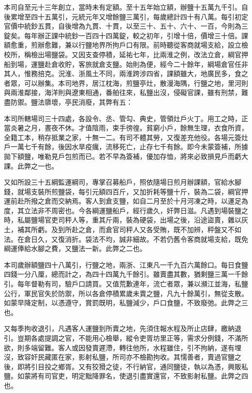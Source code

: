 \begin{pinyinscope}
 本司自至元十三年創立，當時未有定額。至十五年始立額，辦鹽十五萬九千引。自後累增至四十五萬引，元統元年又增餘鹽三萬引，每歲總計四十有八萬。每引初定官價中統鈔五貫，自後增為九貫、十貫，以至三十、五十、六十、一百，今則為三錠矣。每年辦正課中統鈔一百四十四萬錠，較之初年，引增十倍，價增三十倍。課額愈重，煎辦愈難，兼以行鹽地界所拘戶口有限。前時聽從客商就場支給，設立檢校所，稱檢出場鹽袋。又因支查停積，延祐七年，比兩淮之例，改法立倉，綱官押船到場，運鹽赴倉收貯，客旅就倉支鹽。始則為便，經今二十餘年，綱場倉官任非其人，惟務掊克。況淮、浙風土不同，兩淮跨涉四省，課額雖大，地廣民多，食之者眾，可以辦集。本司地界，居江枕海，煎鹽亭灶，散漫海隅，行鹽之地，里河則與兩淮鄰接，海洋則與遼東相通，番舶往來，私鹽出沒，侵礙官課，雖有刑禁，難盡防禦。鹽法隳壞，亭民消廢，其弊有五：



 本司所轄場司三十四處，各設令、丞、管勾、典史，管領灶戶火丁。用工之時，正當炎暑之月，晝夜不休。才值陰雨，束手徬徨。貧窮小戶，餘無生理，衣食所資，全籍工本，稍存抵業之家，十無一二。有司不體其勞，又復差充他役。各場元簽灶戶一萬七千有餘，後因水旱疫癘，流移死亡，止存七千有餘。即今未蒙簽補，所據拋下額鹽，唯勒見戶包煎而已。若不早為簽補，優加存恤，將來必致損見戶而虧大課。此弊之一也。



 又如所設三十五綱監運綱司，專掌召募船戶，照依隨場日煎月辦課額，官給水腳錢，就場支裝所煎鹽袋，每引元額四百斤，又加折耗等鹽十斤，裝為二袋，綱官押運前赴所撥之倉而交納焉。客人到倉支鹽，如自二月至於十月河凍之時，以運足為度，其立法非不周密也。今各綱運鹽船戶，經行歲久，奸弊日滋。凡遇到場裝鹽之時，私屬鹽場官吏司秤人等，重其斤兩，裝為硬袋，出場之後，沿途盜賣，雜以灰土，補其所虧。及到所赴之倉，而倉官司秤人又各受賄，既不加辨，秤盤又不如法。在倉日久，又復消折。袋法不均，誠非細故。不若仍舊令客商就場支給，既免綱運俸給水腳之費，又鹽法一新。此弊之二也。



 本司歲辦額鹽四十八萬引，行鹽之地，兩浙、江東凡一千九百六萬餘口。每日食鹽四錢一分八厘，總而計之，為四十四萬九千餘引。雖賣盡其數，猶剩鹽三萬一千餘引。每年督勒有司，驗戶口請買。又值荒歉連年，流亡者眾，兼以瀕江並海，私鹽公行，軍民官失於防禦，所以各倉停積累歲未賣之鹽，凡九十餘萬引，無從支散。如蒙早降定制，以憑遵守，賞罰既明，私鹽減少，戶口食鹽，不致廢弛。此弊之三也。



 又每季拘收退引，凡遇客人運鹽到所賣之地，先須住報水程及所止店肆，繳納退引。豈期各處提調之官，不能用心檢舉，縱令吏胥坊里正等，需求分例錢，不滿所欲，則多端留難。客人或因發賣遲滯，轉往他所，水程雖住，引不拘納，遂有埋沒，致容奸民藏匿在家，影射私鹽，所司亦不檢勘拘收。其懦善者，賣過官鹽之後，即將引目投之鄉胥。又有狡猾之徒，不行納官，通同鹽徒，執以為憑，興販私鹽。如蒙將有司官吏，明定黜降罪名，使退引盡實還官，不致影射私鹽。此弊之四也。




\end{pinyinscope}

